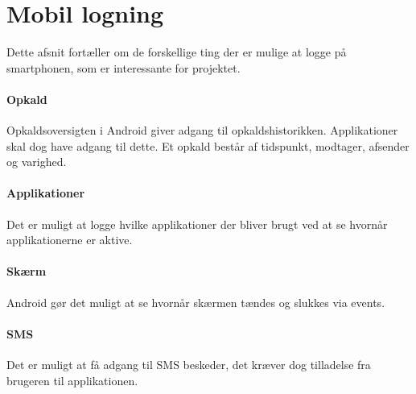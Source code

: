 \section{Mobil logning}\label{logning}
Dette afsnit fortæller om de forskellige ting der er mulige at logge på smartphonen, som er interessante for projektet.

\paragraph{Opkald}
Opkaldsoversigten i Android giver adgang til opkaldshistorikken.
Applikationer skal dog have adgang til dette.
Et opkald består af tidspunkt, modtager, afsender og varighed.

\paragraph{Applikationer}
Det er muligt at logge hvilke applikationer der bliver brugt ved at se hvornår applikationerne er aktive.

\paragraph{Skærm}
Android gør det muligt at se hvornår skærmen tændes og slukkes via events.  

\paragraph{SMS}
Det er muligt at få adgang til SMS beskeder, det kræver dog tilladelse fra brugeren til applikationen.